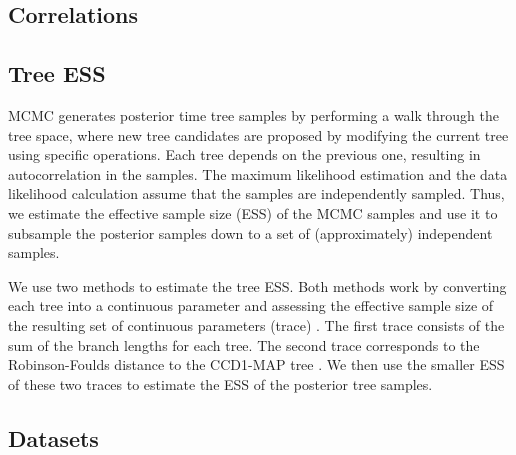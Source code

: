 \documentclass[10pt,letterpaper]{article}
\begin{document}
\subsection*{Correlations}

\subsection*{Tree ESS}

MCMC generates posterior time tree samples by performing a walk through the tree space, where new tree candidates are proposed by modifying the current tree using specific operations. Each tree depends on the previous one, resulting in autocorrelation in the samples. The maximum likelihood estimation and the data likelihood calculation assume that the samples are independently sampled. Thus, we estimate the effective sample size (ESS) of the MCMC samples and use it to subsample the posterior samples down to a set of (approximately) independent samples.

We use two methods to estimate the tree ESS. Both methods work by converting each tree into a continuous parameter and assessing the effective sample size of the resulting set of continuous parameters (trace) \cite{treeess,vehtari2021rank}. The first trace consists of the sum of the branch lengths for each tree. The second trace corresponds to the Robinson-Foulds distance to the CCD1-MAP tree \cite{ccd}. We then use the smaller ESS of these two traces to estimate the ESS of the posterior tree samples.

\subsection*{Datasets}

\nolinenumbers


\end{document}
